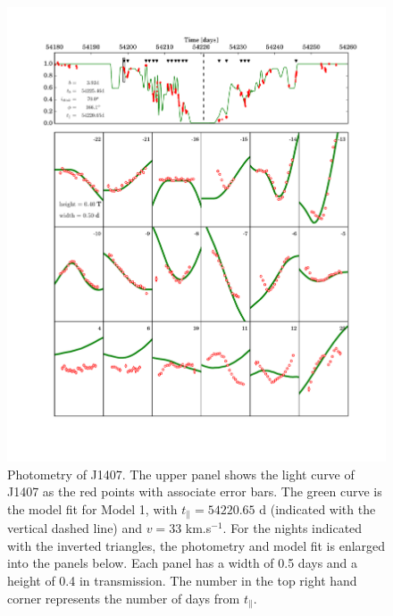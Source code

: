 \documentclass{emulateapj}
\begin{document}
\begin{figure}
\centering
\includegraphics[angle=0,width=16cm]{fig4}

\caption{Photometry of J1407.
The upper panel shows the light curve of J1407 as the red points with
associate error bars.
The green curve is the model fit for Model 1, with
$t_\parallel=54220.65$ d (indicated with the vertical dashed line) and
$v=33$ km.s$^{-1}$.
For the nights indicated with the inverted triangles, the photometry and
model fit is enlarged into the panels below.
Each panel has a width of 0.5 days and a height of 0.4 in transmission.
The number in the top right hand corner represents the number of days
from $t_\parallel$.  \label{fig:dailyfit}}

\end{figure}
\end{document}
